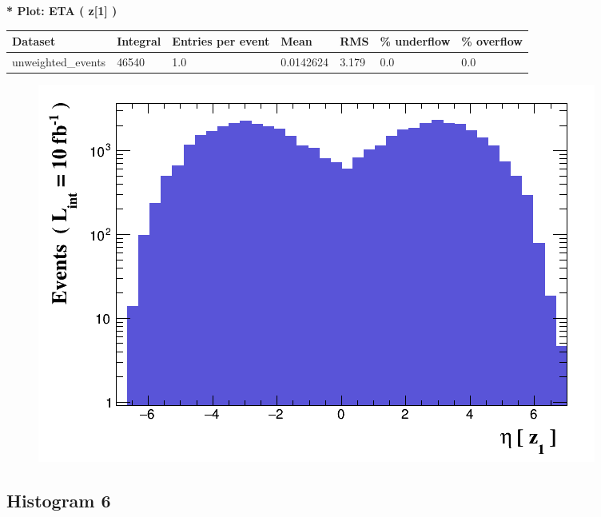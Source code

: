 \documentclass[a4paper, 10pt]{article}
\begin{document}
\textbf{* Plot: ETA ( z[1] ) }\\
   \begin{table}[H]
  \begin{center}
    \begin{tabular}{|m{23.0mm}|m{23.0mm}|m{18.0mm}|m{19.0mm}|m{19.0mm}|m{19.0mm}|m{19.0mm}|}
      \hline
      {\cellcolor{yellow}         Dataset}& {\cellcolor{yellow}         Integral}& {\cellcolor{yellow}         Entries per event}& {\cellcolor{yellow}         Mean}& {\cellcolor{yellow}         RMS}& {\cellcolor{yellow}         \% underflow}& {\cellcolor{yellow}         \% overflow}\\
      \hline
      {\cellcolor{white}         unweighted\_events}& {\cellcolor{white}         46540}& {\cellcolor{white}         1.0}& {\cellcolor{white}         0.0142624}& {\cellcolor{white}         3.179}& {\cellcolor{green}         0.0}& {\cellcolor{green}         0.0}\\
\hline
    \end{tabular}
  \end{center}
\end{table}

\begin{figure}[H]
  \begin{center}
    \includegraphics[scale=0.45]{selection_4.png}\\
\caption{   }
  \end{center}
\end{figure}
      \newpage
\subsection{ Histogram 6}
\end{document}
